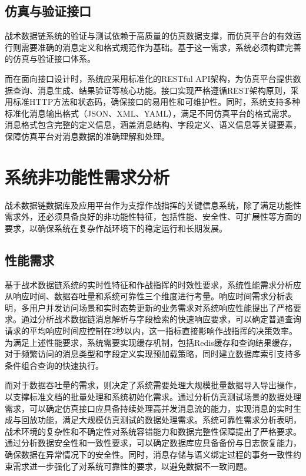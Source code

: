 \subsection{仿真与验证接口}
战术数据链系统的验证与测试依赖于高质量的仿真数据支撑，而仿真平台的有效运行则需要准确的消息定义和格式规范作为基础。基于这一需求，系统必须构建完善的仿真与验证接口体系。

而在面向接口设计时，系统应采用标准化的RESTful API架构，为仿真平台提供数据查询、消息生成、结果验证等核心功能。接口实现严格遵循REST架构原则，采用标准HTTP方法和状态码，确保接口的易用性和可维护性。同时，系统支持多种标准化消息输出格式（JSON、XML、YAML），满足不同仿真平台的格式需求。消息格式包含完整的定义信息，涵盖消息结构、字段定义、语义信息等关键要素，保障仿真平台对消息数据的准确理解和处理。

\section{系统非功能性需求分析}

战术数据链数据库及应用平台作为支撑作战指挥的关键信息系统，除了满足功能性需求外，还必须具备良好的非功能性特征，包括性能、安全性、可扩展性等方面的要求，以确保系统在复杂作战环境下的稳定运行和长期发展\cite{Kagioglidis_2009}。

\subsection{性能需求}
基于战术数据链系统的实时性特征和作战指挥的时效性要求，系统性能需求分析应从响应时间、数据吞吐量和系统可靠性三个维度进行考量\cite{Kee_2008,baek2016_adhoc,baek2019_jsyst_timemirror}。响应时间需求分析表明，多用户并发访问场景和实时态势更新的业务需求对系统响应性能提出了严格要求。通过分析战术数据链消息解析与字段检索的快速响应要求，可以确定普通查询请求的平均响应时间应控制在2秒以内，这一指标直接影响作战指挥的决策效率。为满足上述性能要求，系统需要实现缓存机制，包括Redis缓存和查询结果缓存，对于频繁访问的消息类型和字段定义实现预加载策略，同时建立数据库索引支持多条件组合查询的快速执行。

而对于数据吞吐量的需求，则决定了系统需要处理大规模批量数据导入导出操作，以支撑标准文档的批量处理和系统初始化需求。通过分析仿真测试场景的数据处理需求，可以确定仿真接口应具备持续处理高并发消息流的能力，实现消息的实时生成与回放功能，满足大规模仿真测试的数据处理需求\cite{lee2018_jsyst,Spyridis_2010,Kopp_Throughput_Enhanced_JTIDS_2006,Juarez_2025}。系统可靠性需求分析表明，战术环境的复杂性和不确定性对系统容错能力和数据完整性保障提出了严格要求。通过分析数据安全性和一致性要求，可以确定数据库应具备备份与日志恢复能力，确保数据在异常情况下的安全性。同时，消息存储与语义绑定过程的事务一致性约束需求进一步强化了对系统可靠性的要求，以避免数据不一致问题\cite{Koromilas_2009,EverythingRF_STT}。

